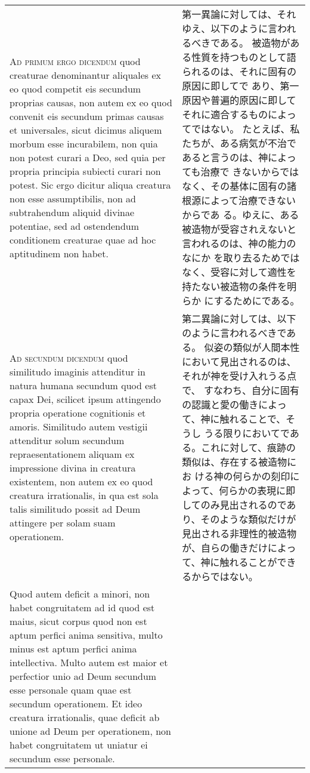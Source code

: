 \documentclass[10pt]{jsarticle} %
\begin{document}
\begin{longtable}{p{21em}p{21em}}
\\



{\scshape Ad primum ergo dicendum} quod creaturae denominantur aliquales ex eo quod
competit eis secundum proprias causas, non autem ex eo quod convenit eis
secundum primas causas et universales, sicut dicimus aliquem morbum esse
incurabilem, non quia non potest curari a Deo, sed quia per propria
principia subiecti curari non potest. Sic ergo dicitur aliqua creatura
non esse assumptibilis, non ad subtrahendum aliquid divinae potentiae,
sed ad ostendendum conditionem creaturae quae ad hoc aptitudinem non
habet.


&

第一異論に対しては、それゆえ、以下のように言われるべきである。
被造物がある性質を持つものとして語られるのは、それに固有の原因に即してで
 あり、第一原因や普遍的原因に即してそれに適合するものによってではない。
 たとえば、私たちが、ある病気が不治であると言うのは、神によっても治療で
 きないからではなく、その基体に固有の諸根源によって治療できないからであ
 る。ゆえに、ある被造物が受容されえないと言われるのは、神の能力のなにか
 を取り去るためではなく、受容に対して適性を持たない被造物の条件を明らか
 にするためにである。


\\



{\scshape Ad secundum dicendum} quod similitudo imaginis attenditur in natura
humana secundum quod est capax Dei, scilicet ipsum attingendo propria
operatione cognitionis et amoris. Similitudo autem vestigii attenditur
solum secundum repraesentationem aliquam ex impressione divina in
creatura existentem, non autem ex eo quod creatura irrationalis, in qua
est sola talis similitudo possit ad Deum attingere per solam suam
operationem. 


&

第二異論に対しては、以下のように言われるべきである。
似姿の類似が人間本性において見出されるのは、それが神を受け入れうる点で、
 すなわち、自分に固有の認識と愛の働きによって、神に触れることで、そうし
 うる限りにおいてである。これに対して、痕跡の類似は、存在する被造物にお
 ける神の何らかの刻印によって、何らかの表現に即してのみ見出されるのであ
 り、そのような類似だけが見出される非理性的被造物が、自らの働きだけによっ
 て、神に触れることができるからではない。


\\

Quod autem deficit a minori, non habet congruitatem ad id
quod est maius, sicut corpus quod non est aptum perfici anima sensitiva,
multo minus est aptum perfici anima intellectiva. Multo autem est maior
et perfectior unio ad Deum secundum esse personale quam quae est
secundum operationem. Et ideo creatura irrationalis, quae deficit ab
unione ad Deum per operationem, non habet congruitatem ut uniatur ei
secundum esse personale.



\end{longtable}
\end{document}
